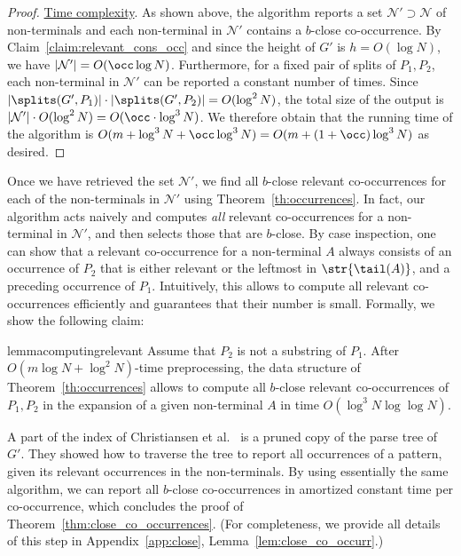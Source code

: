 \begin{proof}
{\underline{Time complexity}}. 
As shown above, the algorithm reports a set $\mathcal{N}' \supset \mathcal{N}$ of non-terminals and each non-terminal in $\mathcal{N}'$ contains a $b$-close co-occurrence. By Claim~\ref{claim:relevant_cons_occ} and since the height of $G'$ is $h = O(\log N)$, we have $|\mathcal{N}'| = O(\occ \log N)$. Furthermore, for a fixed pair of splits of $P_1,P_2$, each non-terminal in $\mathcal{N}'$ can be reported a constant number of times. Since $|\splits(G',P_1)| \cdot |\splits(G',P_2)| = O(\log^2 N)$, the total size of the output is $|\mathcal{N}'| \cdot O(\log^2 N) = O(\occ \cdot \log^3 N)$. We therefore obtain that the running time of the algorithm is $O(m+\log^3 N + \occ \log^3 N) = O(m+(1+\occ)\log^3 N)$ as desired. 
\end{proof}

Once we have retrieved the set $\mathcal{N}'$, we find all $b$-close relevant co-occurrences for each of the non-terminals in $\mathcal{N}'$ using Theorem~\ref{th:occurrences}. In fact, our algorithm acts naively and computes \emph{all} relevant co-occurrences for a non-terminal in $\mathcal{N}'$, and then selects those that are $b$-close. By case inspection, one can show that a relevant co-occurrence for a non-terminal $A$ always consists of an occurrence of $P_2$ that is either relevant or the leftmost in $\str{\tail(A)}$, and a preceding occurrence of $P_1$. Intuitively, this allows to compute all relevant co-occurrences efficiently and guarantees that their number is small. Formally, we show the following claim: 

\begin{restatable}{lemma}{computingrelevant}\label{lem:relevant_co_occurr_A}
Assume that $P_2$ is not a substring of $P_1$. After $O(m \log N + \log^2 N)$-time preprocessing, the data structure of Theorem~\ref{th:occurrences} allows to compute all $b$-close relevant co-occurrences of $P_1, P_2$ in the expansion of a given non-terminal $A$ in time $O(\log^{3} N \log\log N)$. 
\end{restatable}


A part of the index of Christiansen et al.~\cite{talg/ChristiansenEKN21} is a pruned copy of the parse tree of $G'$. They showed how to traverse the tree to report all occurrences of a pattern, given its relevant occurrences in the non-terminals. By using essentially the same algorithm, we can report all $b$-close co-occurrences in amortized constant time per co-occurrence, which concludes the proof of Theorem~\ref{thm:close_co_occurrences}. (For completeness, we provide all details of this step in Appendix~\ref{app:close}, Lemma~\ref{lem:close_co_occurr}.)  


